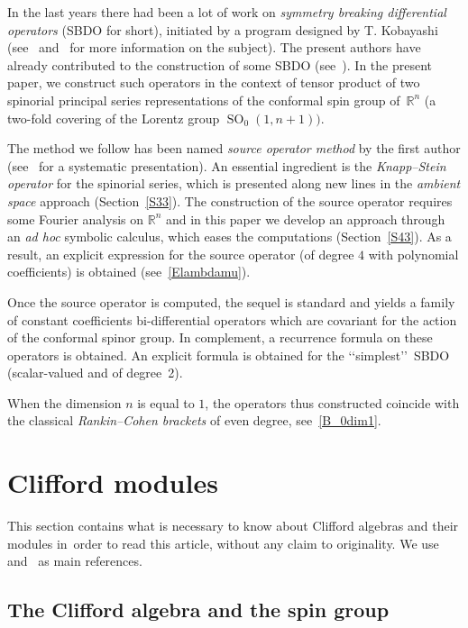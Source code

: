 \documentclass[pdftex]{sigma}
\DeclareMathOperator{\SO}{SO}
\numberwithin{equation}{section}
\begin{document}
In the last years there had been a lot of work on \emph{symmetry breaking differential operators} (SBDO for short), initiated by a program designed by T. Kobayashi (see~\cite{k} and~\cite{kp16} for more information on the subject). The present authors have already contributed to the construction of some SBDO (see~\cite{bc, bck2, bck1, c19}). In the present paper, we construct such operators in the context of tensor product of two spinorial principal series representations of the conformal spin group of~$\mathbb R^n$ (a two-fold covering of the Lorentz group $\SO_0(1, n+1))$.

The method we follow has been named \emph{source operator method} by the first author (see~\cite{c19} for a systematic presentation). An essential ingredient is the \emph{Knapp--Stein operator} for the spinorial series, which is presented along new lines in the \emph{ambient space} approach (Section~\ref{S33}). The construction of the source operator requires some Fourier analysis on $\mathbb R^n$ and in this paper we develop an approach through an \emph{ad hoc} symbolic calculus, which eases the computations (Section~\ref{S43}). As a result, an explicit expression for the source operator (of degree $4$ with polynomial coefficients) is obtained (see~\eqref{Elambdamu}).

Once the source operator is computed, the sequel is standard and yields a family of constant coefficients bi-differential operators which are covariant for the action of the conformal spinor group. In complement, a recurrence formula on these operators is obtained. An explicit formula is obtained for the \lq\lq simplest\rq\rq\ SBDO (scalar-valued and of degree~2).

When the dimension $n$ is equal to $1$, the operators thus constructed coincide with the classical
\emph{Rankin--Cohen brackets} of even degree, see~\eqref{B_0dim1}.

\section{Clifford modules}\vspace{-1ex}

This section contains what is necessary to know about Clifford algebras and their modules in~order to read this article, without any claim to originality. We use~\cite{dss} and~\cite{bgv} as main references.

\subsection{The Clifford algebra and the spin group}
\end{document}

